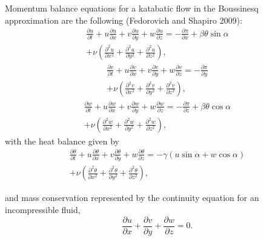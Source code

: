 \documentclass[gmd]{copernicus}
\begin{document}
Momentum balance equations for a katabatic flow in the Boussinesq approximation are the following (Fedorovich and Shapiro 2009): 
\begin{eqnarray} \label{GrindEQ__1_} 
\nonumber \frac{\partial u}{\partial t} +u\frac{\partial u}{\partial x} +v\frac{\partial u}{\partial y} +w\frac{\partial u}{\partial z} =-\frac{\partial \pi }{\partial x} +\beta \theta \sin \alpha \\ +\nu \left(\frac{\partial ^{2} u}{\partial x^{2} } +\frac{\partial ^{2} u}{\partial y^{2} } +\frac{\partial ^{2} u}{\partial z^{2} } \right),  
\end{eqnarray} 
\begin{eqnarray} \label{GrindEQ__2_} 
\nonumber \frac{\partial v}{\partial t} +u\frac{\partial v}{\partial x} +v\frac{\partial v}{\partial y} +w\frac{\partial v}{\partial z} =-\frac{\partial \pi }{\partial y} \\+\nu \left(\frac{\partial ^{2} v}{\partial x^{2} } +\frac{\partial ^{2} v}{\partial y^{2} } +\frac{\partial ^{2} v}{\partial z^{2} } \right),  
\end{eqnarray} 
\begin{eqnarray} \label{GrindEQ__3_} 
\nonumber \frac{\partial w}{\partial t} +u\frac{\partial w}{\partial x} +v\frac{\partial w}{\partial y} +w\frac{\partial w}{\partial z} =-\frac{\partial \pi }{\partial z} +\beta \theta \cos \alpha \\ +\nu \left(\frac{\partial ^{2} w}{\partial x^{2} } +\frac{\partial ^{2} w}{\partial y^{2} } +\frac{\partial ^{2} w}{\partial z^{2} } \right),  
\end{eqnarray} 
with the heat balance given by
\begin{eqnarray} \label{GrindEQ__4_} 
\nonumber \frac{\partial \theta }{\partial t} +u\frac{\partial \theta }{\partial x} +v\frac{\partial \theta }{\partial y} + w\frac{\partial \theta }{\partial z} =-\gamma (u\sin \alpha +w\cos \alpha ) \\+ \nu \left(\frac{\partial ^{2} \theta }{\partial x^{2} } + \frac{\partial ^{2} \theta }{\partial y^{2} } + \frac{\partial ^{2} \theta }{\partial z^{2} } \right),
\end{eqnarray}

and mass conservation represented by the continuity equation for an incompressible fluid,
\begin{equation} \label{GrindEQ__5_} 
\frac{\partial u}{\partial x} +\frac{\partial v}{\partial y} +\frac{\partial w}{\partial z} =0.  
\end{equation}
 
\end{document}

